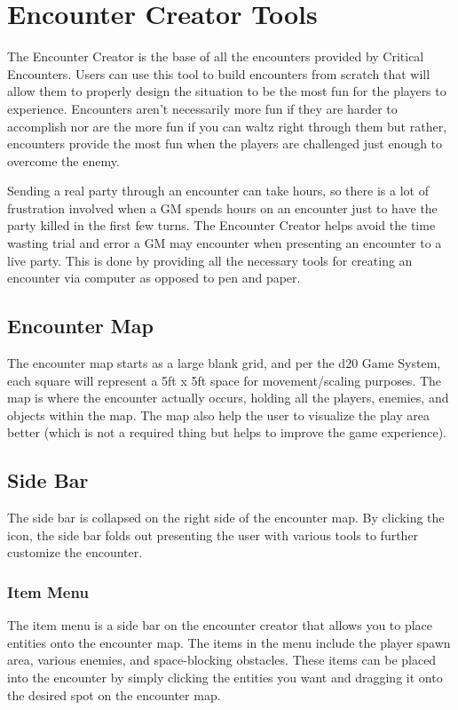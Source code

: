 \documentclass[12pt,a4paper]{report}
\begin{document}
	\section{Encounter Creator Tools}
	The Encounter Creator is the base of all the encounters provided by Critical Encounters. Users can use this tool to build encounters from scratch that will allow them to properly design the situation to be the most fun for the players to experience. Encounters aren't necessarily more fun if they are harder to accomplish nor are the more fun if you can waltz right through them but rather, encounters provide the most fun when the players are challenged just enough to overcome the enemy. 
	
	Sending a real party through an encounter can take hours, so there is a lot of frustration involved when a GM spends hours on an encounter just to have the party killed in the first few turns. The Encounter Creator helps avoid the time wasting trial and error a GM may encounter when presenting an encounter to a live party. This is done by providing all the necessary tools for creating an encounter via computer as opposed to pen and paper.
		\subsection{Encounter Map}
		The encounter map starts as a large blank grid, and per the d20 Game System, each square will represent a 5ft x 5ft space for movement/scaling purposes. The map is where the encounter actually occurs, holding all the players, enemies, and objects within the map. The map also help the user to visualize the play area better (which is not a required thing but helps to improve the game experience).  
		\subsection{Side Bar}
		The side bar is collapsed on the right side of the encounter map. By clicking the icon, the side bar folds out presenting the user with various tools to further customize the encounter.
			\subsubsection{Item Menu}
			The item menu is a side bar on the encounter creator that allows you to place entities onto the encounter map. The items in the menu include the player spawn area, various enemies, and space-blocking obstacles. These items can be placed into the encounter by simply clicking the entities you want and dragging it onto the desired spot on the encounter map.
\end{document}
